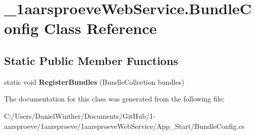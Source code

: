 \hypertarget{class__1aarsproeve_web_service_1_1_bundle_config}{}\section{\+\_\+1aarsproeve\+Web\+Service.\+Bundle\+Config Class Reference}
\label{class__1aarsproeve_web_service_1_1_bundle_config}
\subsection*{Static Public Member Functions}
\begin{DoxyCompactItemize}
\item 
\hypertarget{class__1aarsproeve_web_service_1_1_bundle_config_ab9a18fe210fb037e3bdb7405a0b456e6}{}static void {\bfseries Register\+Bundles} (Bundle\+Collection bundles)\label{class__1aarsproeve_web_service_1_1_bundle_config_ab9a18fe210fb037e3bdb7405a0b456e6}

\end{DoxyCompactItemize}


The documentation for this class was generated from the following file\+:\begin{DoxyCompactItemize}
\item 
C\+:/\+Users/\+Daniel\+Winther/\+Documents/\+Git\+Hub/1-\/aarsproeve/1aarsproeve/1aarsproeve\+Web\+Service/\+App\+\_\+\+Start/Bundle\+Config.\+cs\end{DoxyCompactItemize}
